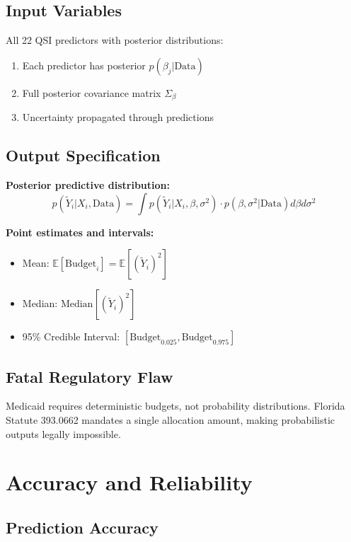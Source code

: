 \subsection{Input Variables}

All 22 QSI predictors with posterior distributions:
\begin{enumerate}
    \item Each predictor has posterior $p(\beta_j | \text{Data})$
    \item Full posterior covariance matrix $\Sigma_{\beta}$
    \item Uncertainty propagated through predictions
\end{enumerate}

\subsection{Output Specification}

\textbf{Posterior predictive distribution:}
\begin{equation}
p(\tilde{Y}_i | X_i, \text{Data}) = \int p(\tilde{Y}_i | X_i, \beta, \sigma^2) \cdot p(\beta, \sigma^2 | \text{Data}) d\beta d\sigma^2
\end{equation}

\textbf{Point estimates and intervals:}
\begin{itemize}
    \item Mean: $\mathbb{E}[\text{Budget}_i] = \mathbb{E}[(\tilde{Y}_i)^2]$
    \item Median: $\text{Median}[(\tilde{Y}_i)^2]$
    \item 95\% Credible Interval: $[\text{Budget}_{0.025}, \text{Budget}_{0.975}]$
\end{itemize}

\subsection{Fatal Regulatory Flaw}

Medicaid requires deterministic budgets, not probability distributions. Florida Statute 393.0662 mandates a single allocation amount, making probabilistic outputs legally impossible.

\section{Accuracy and Reliability}

\subsection{Prediction Accuracy}

